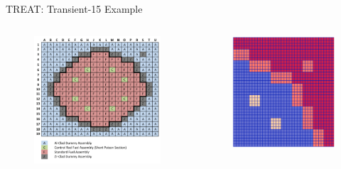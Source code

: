 \documentclass[8pt,xcolor=dvipnames]{beamer}
\begin{document}
\begin{frame}{TREAT: Transient-15 Example}
\begin{columns}

\begin{figure}
\includegraphics[width=\linewidth]{figures/Tran15_config.png}
\end{figure}

\begin{figure}
\includegraphics[width=\linewidth]{figures/Tran15_mesh_homo.png}
\end{figure}

\end{columns}
\end{frame}
\end{document}
